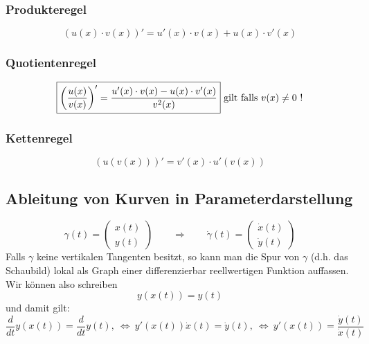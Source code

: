\subsubsection{Produkteregel}
\[ \boxed{ (u(x) \cdot v(x))' = u'(x) \cdot v(x) + u(x) \cdot v'(x) } \]

\subsubsection{Quotientenregel}
\[ \boxed{ \left( \frac{u(x)}{v(x)} \right)' = \frac{ u'(x) \cdot v(x) - u(x) \cdot v'(x) }{ v^2(x) } } \\ \text{ gilt falls }v(x) \neq 0 \text{ !} \]

\subsubsection{Kettenregel}
\[ \boxed{ (u(v(x)))' = v'(x) \cdot u'(v(x)) } \]

\subsection{Ableitung von Kurven in Parameterdarstellung}\label{subsec:ableitungsregeln}
\[ \boxed{\gamma(t) = \left(\begin{matrix}x(t)\\y(t)\end{matrix}\right) \qquad \Rightarrow \qquad \dot{\gamma}(t) = \left(\begin{matrix}\dot{x}(t)\\\dot{y}(t)\end{matrix}\right)} \]
Falls $\gamma$ keine vertikalen Tangenten besitzt, so kann man die Spur von $\gamma$ (d.h. das Schaubild) lokal als Graph einer differenzierbar reellwertigen Funktion auffassen. Wir können also schreiben 
\[ y(x(t)) = y(t) \]
und damit gilt: 
\[ \frac{d}{dt}y(x(t)) = \frac{d}{dt}y(t), ~\Leftrightarrow~ y'(x(t)) \dot{x}(t) = \dot{y}(t), ~\Leftrightarrow~ y'(x(t)) = \frac{\dot{y}(t)}{\dot{x}(t)} \]



